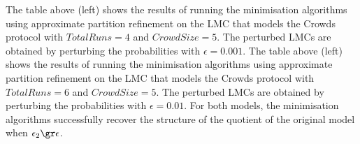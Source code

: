 
The table above (left) shows the results of running the minimisation algorithms using approximate partition refinement on the LMC that models the Crowds protocol \cite{ReiterR98} with $\mathit{TotalRuns}=4$ and $\mathit{CrowdSize}=5$. The perturbed LMCs are obtained by perturbing the probabilities with $\epsilon = 0.001$. The table above (left) shows the results of running the minimisation algorithms using approximate partition refinement on the LMC that models the Crowds protocol \cite{ReiterR98} with $\mathit{TotalRuns}=6$ and $\mathit{CrowdSize}=5$. The perturbed LMCs are obtained by perturbing the probabilities with $\epsilon = 0.01$.  For both models, the minimisation algorithms successfully recover the structure of the quotient of the original model when $\epsilon_2 \gr \epsilon$. 

